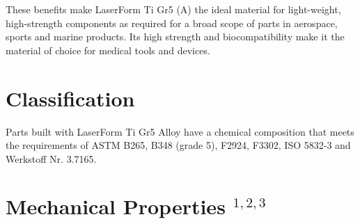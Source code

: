 \documentclass[10pt]{article}
\begin{document}
These benefits make LaserForm Ti Gr5 (A) the ideal material for light-weight, high-strength components as required for a broad scope of parts in aerospace, sports and marine products. Its high strength and biocompatibility make it the material of choice for medical tools and devices.

\section*{Classification}
Parts built with LaserForm Ti Gr5 Alloy have a chemical composition that meets the requirements of ASTM B265, B348 (grade 5), F2924, F3302, ISO 5832-3 and Werkstoff Nr. 3.7165.

\section*{Mechanical Properties ${ }^{1,2,3}$}
\end{document}
